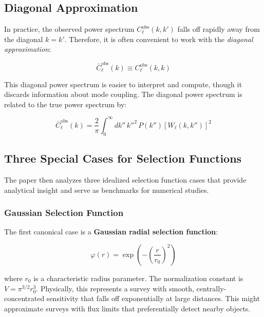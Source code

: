 \subsection{Diagonal Approximation}

In practice, the observed power spectrum $C_\ell^{\text{obs}}(k, k')$ falls off rapidly away from the diagonal $k = k'$. Therefore, it is often convenient to work with the \emph{diagonal approximation}:

\begin{equation}
\bar{C}_\ell^{\text{obs}}(k) \equiv C_\ell^{\text{obs}}(k, k)
\label{eq:diagonal_approx}
\end{equation}

This diagonal power spectrum is easier to interpret and compute, though it discards information about mode coupling. The diagonal power spectrum is related to the true power spectrum by:

\begin{equation}
\bar{C}_\ell^{\text{obs}}(k) = \frac{2}{\pi} \int_0^\infty dk'' \, k''^2 \, P(k'') \left[ W_\ell(k, k'') \right]^2
\label{eq:diagonal_relation}
\end{equation}

\subsection{Three Special Cases for Selection Functions}

The paper then analyzes three idealized selection function cases that provide analytical insight and serve as benchmarks for numerical studies.

\subsubsection{Gaussian Selection Function}

The first canonical case is a \textbf{Gaussian radial selection function}:

\begin{equation}
\varphi(r) = \exp\left( -\left( \frac{r}{r_0} \right)^2 \right)
\label{eq:gaussian_selection}
\end{equation}

where $r_0$ is a characteristic radius parameter. The normalization constant is $V = \pi^{3/2} r_0^3$. Physically, this represents a survey with smooth, centrally-concentrated sensitivity that falls off exponentially at large distances. This might approximate surveys with flux limits that preferentially detect nearby objects.

